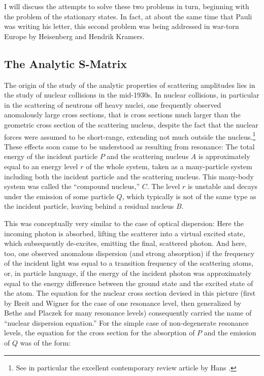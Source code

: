 \documentclass[12pt,a4paper]{article}
\begin{document}
I will discuss the attempts to solve these two problems in turn, beginning with the problem of the stationary states. In fact, at about the same time that Pauli was writing his letter, this second problem was being addressed in war-torn Europe by Heisenberg and Hendrik Kramers.

\subsection{The Analytic S-Matrix}

The origin of the study of the analytic properties of scattering amplitudes lies in the study of nuclear collisions in the mid-1930s. In nuclear collisions, in particular in the scattering of neutrons off heavy nuclei, one frequently observed anomalously large cross sections, that is cross sections much larger than the geometric cross section of the scattering nucleus, despite the fact that the nuclear forces were assumed to be short-range, extending not much outside the  nucleus.\footnote{See in particular the excellent contemporary review article by Hans \citet{bethe_1937_nuclear}.} These effects soon came to be understood as resulting from resonance: The total energy of the incident particle $P$ and the scattering nucleus $A$ is approximately equal to an energy level $r$ of the whole system, taken as a many-particle system including both the incident particle and the scattering nucleus. This many-body system was called the ``compound nucleus,'' $C$. The level $r$ is unstable and decays under the emission of some particle $Q$, which typically is not of the same type as the incident particle, leaving behind a residual nucleus $B$. 

This was conceptually very similar to the case of optical dispersion: Here the incoming photon is absorbed, lifting the scatterer into a virtual excited state, which subsequently de-excites, emitting the final, scattered photon. And here, too, one observed anomalous dispersion (and strong absorption) if the frequency of the incident light was equal to a transition frequency of the scattering atoms, or, in particle language, if the energy of the incident photon was approximately equal to the energy difference between the ground state and the excited state of the atom. The equation for the nuclear cross section devised in this picture (first by Breit and Wigner for the case of one resonance level, then generalized by Bethe and Placzek for many resonance levels) consequently carried the name of ``nuclear dispersion equation.'' For the simple case of non-degenerate resonance levels, the equation for the cross section for the absorption of $P$ and the emission of $Q$ was of the form:
\end{document}
